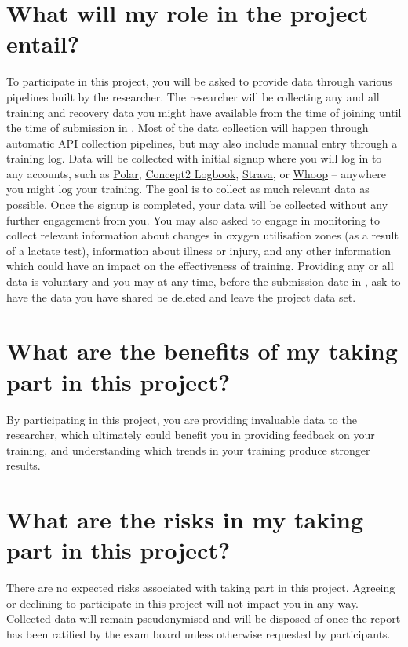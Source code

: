 \section*{What will my role in the project entail?}
To participate in this project, you will be asked to provide data through various pipelines built by the researcher. The researcher will be collecting any and all training and recovery data you might have available from the time of joining until the time of submission in \deadline. Most of the data collection will happen through automatic API collection pipelines, but may also include manual entry through a training log. Data will be collected with initial signup where you will log in to any accounts, such as \href{https://flow.polar.com/}{Polar}, \href{https://log.concept2.com/}{Concept2 Logbook}, \href{https://www.strava.com/}{Strava}, or \href{https://app.whoop.com/}{Whoop} -- anywhere you might log your training. The goal is to collect as much relevant data as possible. Once the signup is completed, your data will be collected without any further engagement from you. You may also asked to engage in monitoring to collect relevant information about changes in oxygen utilisation zones (as a result of a lactate test), information about illness or injury, and any other information which could have an impact on the effectiveness of training. Providing any or all data is voluntary and you may at any time, before the submission date in \deadline, ask to have the data you have shared be deleted and leave the project data set.

\section*{What are the benefits of my taking part in this project?}
By participating in this project, you are providing invaluable data to the researcher, which ultimately could benefit you in providing feedback on your training, and understanding which trends in your training produce stronger results.
\section*{What are the risks in my taking part in this project?}
There are no expected risks associated with taking part in this project. Agreeing or declining to participate in this project will not impact you in any way. Collected data will remain pseudonymised and will be disposed of once the report has been ratified by the exam board unless otherwise requested by participants.
